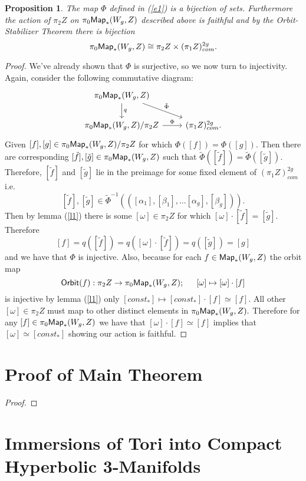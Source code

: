 \documentclass{amsart}
\newtheorem{prop}[theorem]{Proposition}
\theoremstyle{definition}
\theoremstyle{remark}
\begin{document}
\begin{prop}
The map $\Phi$ defined in (\ref{e1}) is a bijection of sets. Furthermore the action of $\pi_{2}Z$ on $\pi_{0}{\sf Map}_{\ast}(W_{g}, Z)$ described above is faithful and by the Orbit-Stabilizer Theorem there is bijection 
$$\pi_{0}{\sf Map}_{\ast}(W_{g}, Z) \cong \pi_{2}Z \times (\pi_{1}Z)^{2g}_{com}.$$
\end{prop}
\begin{proof}
We've already shown that $\Phi$ is surjective, so we now turn to injectivity. Again, consider the following commutative diagram:
$$\begin{tikzcd}
 \pi_{0}{\sf Map}_{\ast}(W_{g}, Z) \arrow[d, "q"] \arrow[rd, "\tilde{\Phi}"] & \\
\pi_{0}{\sf Map}_{\ast}(W_{g}, Z)/\pi_{2}Z \arrow[r, "\Phi"]&  (\pi_{1}Z)^{2g}_{com}.
\end{tikzcd}$$
Given $[f], [g] \in \pi_{0}{\sf Map}_{\ast}(W_{g}, Z)/\pi_{2}Z$ for which $\Phi([f]) = \Phi([g]).$ 
Then there are corresponding $[\tilde{f}], [\tilde{g}] \in \pi_{0}{\sf Map}_{\ast}(W_{g}, Z)$ such that $\tilde{\Phi}([\tilde{f}]) = \tilde{\Phi}([\tilde{g}]).$ 
Therefore, $[\tilde{f}]$ and $[\tilde{g}]$ lie in the preimage for some fixed element of $(\pi_{1}Z)^{2g}_{com}$ i.e. $$[\tilde{f}], [\tilde{g}] \in \tilde{\Phi}^{-1}(([\alpha_{1}], [\beta_{1}], \hdots [\alpha_{g}], [\beta_{g}])).$$ Then by lemma (\ref{l1}) there is some $[\omega] \in \pi_{2}Z$ for which $[\omega] \cdot [\tilde{f}] = [\tilde{g}].$ Therefore $$[f] = q([\tilde{f}]) = q([\omega] \cdot [\tilde{f}]) = q([\tilde{g}]) = [g]$$ and we have that $\Phi$ is injective.
\newline \newline
Also, because for each $f \in {\sf Map}_{\ast}(W_{g}, Z)$ the orbit map $${\sf Orbit}(f): \pi_{2}Z \rightarrow \pi_{0}{\sf Map}_{\ast}(W_{g}, Z); \hspace{15pt} [\omega] \mapsto [\omega] \cdot [f]$$ is injective by lemma (\ref{l1}) only $[const_{\ast}] \mapsto [const_{\ast}] \cdot [f] \simeq [f].$ All other $[\omega] \in \pi_{2}Z$ must map to other distinct elements in $\pi_{0}{\sf Map}_{\ast}(W_{g}, Z).$ Therefore for any $[f] \in \pi_{0}{\sf Map}_{\ast}(W_{g}, Z)$ we have that $[\omega] \cdot [f] \simeq [f]$ implies that $[\omega] \simeq [const_{\ast}]$ showing our action is faithful. 
\end{proof}

\section{Proof of Main Theorem} \label{tmain}

\begin{proof}

\end{proof}

\section{Immersions of Tori into Compact Hyperbolic 3-Manifolds}

\begin{thebibliography}{9}

\end{thebibliography}
\end{document}
